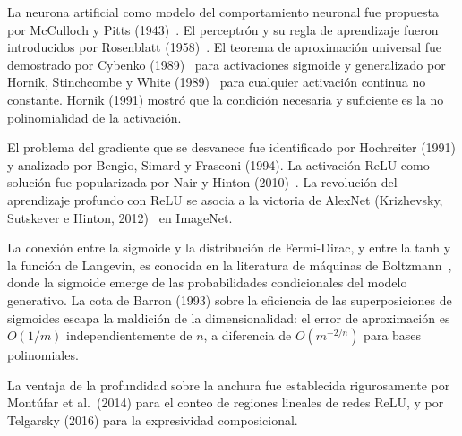 \begin{notasbib}
La neurona artificial como modelo del comportamiento neuronal fue
propuesta por McCulloch y Pitts (1943)~\cite{mcculloch1943logical}. El
perceptrón y su regla de aprendizaje fueron introducidos por Rosenblatt
(1958)~\cite{rosenblatt1958perceptron}. El teorema de aproximación
universal fue demostrado por Cybenko
(1989)~\cite{cybenko1989approximation} para activaciones sigmoide y
generalizado por Hornik, Stinchcombe y White
(1989)~\cite{hornik1989multilayer} para cualquier activación continua no
constante. Hornik (1991) mostró que la condición necesaria y suficiente
es la no polinomialidad de la activación.

El problema del gradiente que se desvanece fue identificado por
Hochreiter (1991) y analizado por Bengio, Simard y Frasconi (1994). La
activación ReLU como solución fue popularizada por Nair y Hinton
(2010)~\cite{nair2010rectified}. La revolución del aprendizaje profundo
con ReLU se asocia a la victoria de AlexNet (Krizhevsky, Sutskever e
Hinton, 2012)~\cite{krizhevsky2012imagenet} en ImageNet.

La conexión entre la sigmoide y la distribución de Fermi-Dirac, y entre
la tanh y la función de Langevin, es conocida en la literatura de
máquinas de Boltzmann~\cite{hinton2006fast}, donde la sigmoide emerge de
las probabilidades condicionales del modelo generativo. La cota de Barron
(1993) sobre la eficiencia de las superposiciones de sigmoides escapa la
maldición de la dimensionalidad: el error de aproximación es $O(1/m)$
independientemente de $n$, a diferencia de $O(m^{-2/n})$ para bases
polinomiales.

La ventaja de la profundidad sobre la anchura fue establecida
rigurosamente por Montúfar et al.\ (2014) para el conteo de regiones
lineales de redes ReLU, y por Telgarsky (2016) para la expresividad
composicional.
\end{notasbib}


